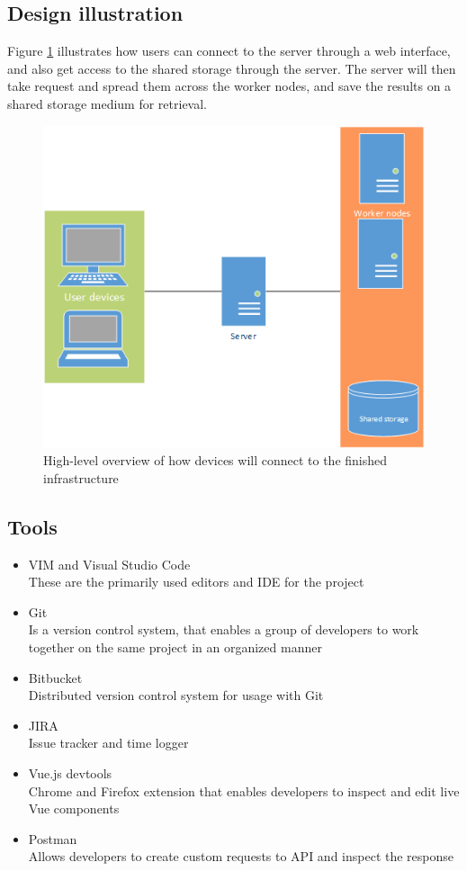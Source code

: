 \documentclass[../main.tex]{subfiles}
\begin{document}
\subsection{Design illustration}
Figure \ref{fig:high_level_design} illustrates how users can connect to the server through a web interface, and also get access to the shared storage through the server. The server will then take request and spread them across the worker nodes, and save the results on a shared storage medium for retrieval.
\begin{figure}[H]
    \centering
    \includegraphics[scale=.6]{img/High_level_design.png}
    \caption{High-level overview of how devices will connect to the finished infrastructure}
    \label{fig:high_level_design}
\end{figure}

\newpage
\subsection{Tools}
\begin{itemize}
    \item VIM\cite{vim} and Visual Studio Code\cite{vscode}\\These are the primarily used editors and IDE for the project
    \item Git\cite{git}\\ Is a version control system, that enables a group of developers to work together on the same project in an organized manner
    \item Bitbucket\cite{bitbucket}\\ Distributed version control system for usage with Git
    \item JIRA\cite{jira}\\ Issue tracker and time logger
    \item Vue.js devtools\cite{vuejsdevtools}\\Chrome and Firefox extension that enables developers to inspect and edit live Vue components
    \item Postman\cite{postman}\\ Allows developers to create custom requests to API and inspect the response
\end{itemize}
\end{document}
